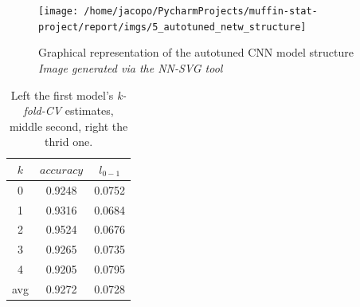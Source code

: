 \begin{figure}
    \centering
    \texttt{[image: /home/jacopo/PycharmProjects/muffin-stat-project/report/imgs/5\_autotuned\_netw\_structure]}
    \caption{
        Graphical representation of the autotuned CNN model structure\\
        \textit{Image generated via the NN-SVG tool}
    }
    \label{fig:5_autotuned_netw_structure}
\end{figure}
\begin{table}
    \centering
    \begin{tabular}{| c | c | c |}
        \hline
        $k$ & $accuracy$ & $l_{0-1}$ \\
        \hline\hline
        0   & 0.9248     & 0.0752    \\
        \hline
        1   & 0.9316     & 0.0684    \\
        \hline
        2   & 0.9524     & 0.0676    \\
        \hline
        3   & 0.9265     & 0.0735    \\
        \hline
        4   & 0.9205     & 0.0795    \\
        \hline
        \hline
        avg & 0.9272     & 0.0728    \\
        \hline
    \end{tabular}
    \caption{
        Left the first model's  \textit{k-fold-CV} estimates, middle second,  right the thrid one.
    }

    \label{tab:kfoldbestcnn}
\end{table}
